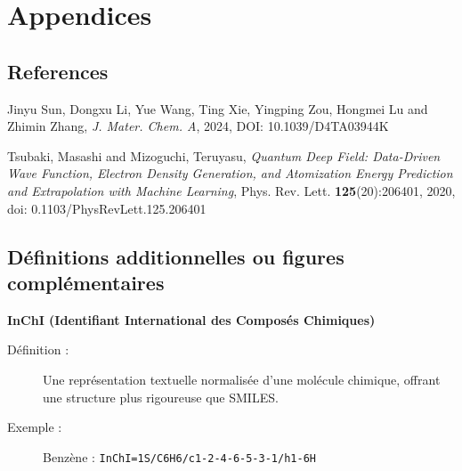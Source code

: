 \section{Appendices}


\subsection{References}


\sloppy %

\begin{thebibliography}{9}

Jinyu Sun, Dongxu Li, Yue Wang, Ting Xie, Yingping Zou, Hongmei Lu and Zhimin Zhang, \textit{J. Mater. Chem. A}, 2024,  DOI: 10.1039/D4TA03944K


Tsubaki, Masashi and Mizoguchi, Teruyasu, \textit{Quantum Deep Field: Data-Driven Wave Function, Electron Density Generation, and Atomization Energy Prediction and Extrapolation with Machine Learning}, Phys. Rev. Lett. \textbf{125}(20):206401, 2020, doi: 0.1103/PhysRevLett.125.206401 %

\end{thebibliography}



\subsection{Définitions additionnelles ou figures complémentaires}

\textbf{InChI (Identifiant International des Composés Chimiques)}

\begin{description}
  \item[Définition :] Une représentation textuelle normalisée d'une molécule chimique, offrant une structure plus rigoureuse que SMILES.

  \item[Exemple :]
  Benzène : \texttt{InChI=1S/C6H6/c1-2-4-6-5-3-1/h1-6H}
\end{description} 

\vspace{0.25cm}

